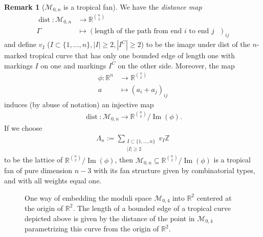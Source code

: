 \documentclass[11pt,reqno,a4]{amsart}
\theoremstyle{dotless}
\theoremstyle{definition}
\newtheorem{remark}[corollary]{Remark}
\begin{document}
\begin{remark}[$\mathcal{M}_{0,n}$ is a tropical fan]
We have the \textit{distance map}
\begin{align*}
\operatorname{dist}:\mathcal{M}_{0,n} &\to\mathbb{R}^{n\choose 2}\\
\Gamma &\mapsto (\textrm{length of the path from end $i$ to end $j$ })_{ij}
\end{align*}
and define $v_I$ ($I\subset \{1,\dots ,n\}, |I|\geq 2, |I^C|\geq 2$) to be the image under dist of the $n$-marked tropical curve that has only one bounded edge of length one with markings $I$ on one and markings $I^C$ on the other side. Moreover, the map
\begin{align*}
\phi:\mathbb{R}^n &\to \mathbb{R}^{n\choose 2}\\
a &\mapsto (a_i+a_j)_{ij}
\end{align*}
induces (by abuse of notation) an injective map
\begin{align*}
\operatorname{dist}:\mathcal{M}_{0,n} \to\mathbb{R}^{n\choose 2}/\operatorname{Im}(\phi).
\end{align*}
If we choose
\begin{align*}
\Lambda_n:=\sum_{\substack{I\subset \{1,\dots ,n\}\\ |I|\geq 2}}v_I\mathbb{Z}
\end{align*}
to be the lattice of $\mathbb{R}^{n\choose 2}/\operatorname{Im}(\phi)$, then $\mathcal{M}_{0,n}\subseteq\mathbb{R}^{n\choose 2}/\operatorname{Im}(\phi)$ is a tropical fan of pure dimension $n-3$ with its fan structure given by combinatorial types, and with all weights equal one.
\end{remark}

\begin{figure}
\centering
\def\svgwidth{150pt}

\caption{One way of embedding the moduli space $\mathcal{M}_{0,4}$ into $\mathbb{R}^2$ centered at the origin of $\mathbb{R}^2$. The length of a bounded edge of a tropical curve depicted above is given by the distance of the point in $\mathcal{M}_{0,4}$ parametrizing this curve from the origin of $\mathbb{R}^2$.}
\label{Example_M_0_4}
\end{figure}
\end{document}
